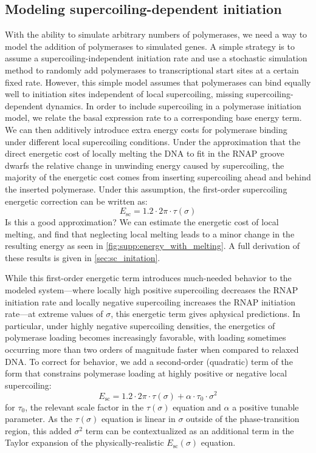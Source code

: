 \documentclass[11pt]{article}
\begin{document}
\subsection{Modeling supercoiling-dependent initiation}
With the ability to simulate arbitrary numbers of polymerases, we need a way to model the addition of polymerases to simulated genes. A simple strategy is to assume a supercoiling-independent initiation rate and use a stochastic simulation method to randomly add polymerases to transcriptional start sites at a certain fixed rate. However, this simple model assumes that polymerases can bind equally well to initiation sites independent of local supercoiling, missing supercoiling-dependent dynamics. In order to include supercoiling in a polymerase initiation model, we relate the basal expression rate to a corresponding base energy term. We can then additively introduce extra energy costs for polymerase binding under different local supercoiling conditions. Under the approximation that the direct energetic cost of locally melting the DNA to fit in the RNAP groove dwarfs the relative change in unwinding energy caused by supercoiling, the majority of the energetic cost comes from inserting supercoiling ahead and behind the inserted polymerase. Under this assumption, the first-order supercoiling energetic correction can be written as:
\begin{equation}
    E_\text{sc} = 1.2  \cdot 2\pi \cdot \tau(\sigma)
\label{eq:first_order_sc_initation}
\end{equation}
 Is this a good approximation? We can estimate the energetic cost of local melting, and find that neglecting local melting leads to a minor change in the resulting energy as seen in \cref{fig:supp:energy_with_melting}. A full derivation of these results is given in \cref{sec:sc_initation}.

While this first-order energetic term introduces much-needed behavior to the modeled system---where locally high positive supercoiling decreases the RNAP initiation rate and locally negative supercoiling increases the RNAP initiation rate---at extreme values of \(\sigma\), this energetic term gives aphysical predictions. In particular, under highly negative supercoiling densities, the energetics of polymerase loading becomes increasingly favorable, with loading sometimes occurring more than two orders of magnitude faster when compared to relaxed DNA. To correct for behavior, we add a second-order (quadratic) term of the form that constrains polymerase loading at highly positive or negative local supercoiling:
\begin{equation}
    E_\text{sc} = 1.2  \cdot 2\pi \cdot \tau(\sigma) + \alpha \cdot \tau_0 \cdot \sigma^2
\label{eq:second_order_sc_initation}
\end{equation}
for \(\tau_0\), the relevant scale factor in the \(\tau(\sigma)\) equation \parencite{markoTorqueDynamicsLinking2007} and \(\alpha\) a positive tunable parameter. As the \(\tau(\sigma)\) equation is linear in \(\sigma\) outside of the phase-transition region, this added \(\sigma^2\) term can be contextualized as an additional term in the Taylor expansion of the physically-realistic \(E_\text{sc}(\sigma)\) equation.
\end{document}
